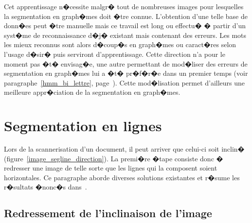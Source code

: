 Cet apprentissage n�cessite malgr� tout de nombreuses images pour lesquelles la segmentation en graph�mes doit �tre connue. L'obtention d'une telle base de donn�es peut �tre manuelle mais ce travail est long ou effectu� � partir d'un syst�me de reconnaissance d�j� existant mais contenant des erreurs. Les mots les mieux reconnus sont alors d�coup�s en graph�mes ou caract�res selon l'usage d�sir� puis serviront d'apprentissage. Cette direction n'a pour le moment pas �t� envisag�e, une autre permettant de mod�liser des erreurs de segmentation en graph�mes lui a �t� pr�f�r�e dans un premier temps (voir paragraphe~\ref{hmm_bi_lettre}, page~\pageref{hmm_bi_lettre}).   Cette mod�lisation permet d'ailleurs une meilleure appr�ciation de la segmentation en graph�mes.













\section{Segmentation en lignes}
\label{image_seg_line}

Lors de la scannerisation d'un document, il peut arriver que celui-ci soit inclin� (figure~\ref{image_segline_direction}). La premi�re �tape consiste donc � redresser une image de telle sorte que les lignes qui la composent soient horizontales. Ce paragraphe aborde diverses solutions existantes et r�sume les r�sultats �nonc�s dans~.






\subsection{Redressement de l'inclinaison de l'image}


